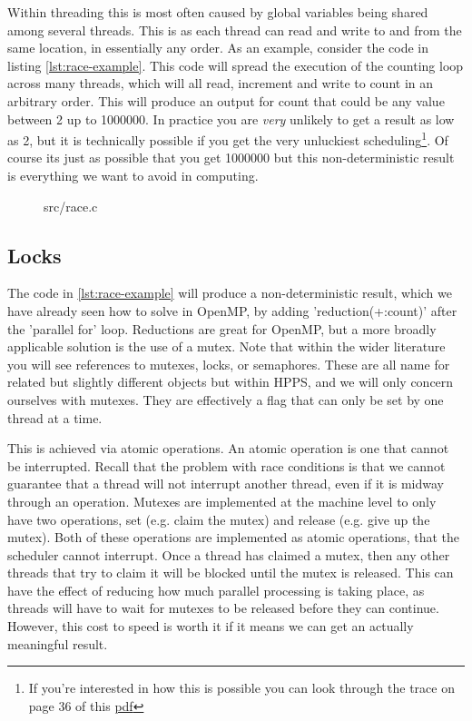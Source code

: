 Within threading this is most often caused by global variables being shared among several threads. This is as each thread can read and write to and from the same location, in essentially any order. As an example, consider the code in listing \ref{lst:race-example}. This code will spread the execution of the counting loop across many threads, which will all read, increment and write to count in an arbitrary order. This will produce an output for count that could be any value between 2 up to 1000000. In practice you are \textit{very} unlikely to get a result as low as 2, but it is technically possible if you get the very unluckiest scheduling\footnote{If you're interested in how this is possible you can look through the trace on page 36 of this \href{https://link.springer.com/content/pdf/10.1007/s00165-017-0447-x.pdf}{pdf}}. Of course its just as possible that you get 1000000 but this non-deterministic result is everything we want to avoid in computing. 

\begin{figure}
  
  {src/race.c}
\end{figure}
  
\subsection{Locks}

The code in \ref{lst:race-example} will produce a non-deterministic result, which we have already seen how to solve in OpenMP, by adding 'reduction(+:count)' after the 'parallel for' loop. Reductions are great for OpenMP, but a more broadly applicable solution is the use of a mutex. Note that within the wider literature you will see references to mutexes, locks, or semaphores. These are all name for related but slightly different objects but within HPPS, and we will only concern ourselves with mutexes. They are effectively a flag that can only be set by one thread at a time. 

This is achieved via atomic operations. An atomic operation is one that cannot be interrupted. Recall that the problem with race conditions is that we cannot guarantee that a thread will not interrupt another thread, even if it is midway through an operation. Mutexes are implemented at the machine level to only have two operations, set (e.g. claim the mutex) and release (e.g. give up the mutex). Both of these operations are implemented as atomic operations, that the scheduler cannot interrupt. Once a thread has claimed a mutex, then any other threads that try to claim it will be blocked until the mutex is released. This can have the effect of reducing how much parallel processing is taking place, as threads will have to wait for mutexes to be released before they can continue. However, this cost to speed is worth it if it means we can get an actually meaningful result.

